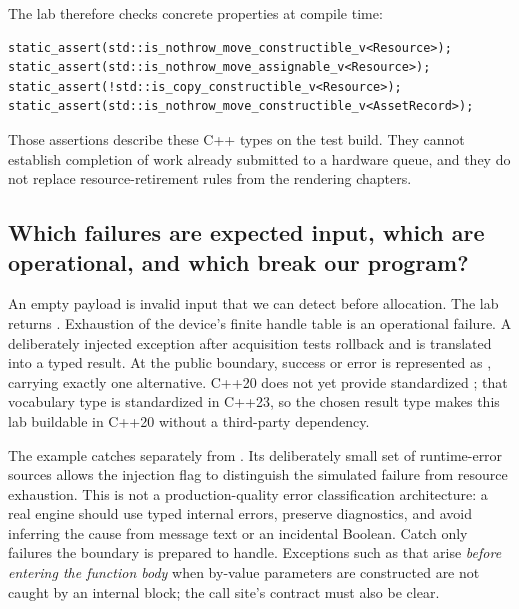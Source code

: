 The lab therefore checks concrete properties at compile time:

\begin{verbatim}
static_assert(std::is_nothrow_move_constructible_v<Resource>);
static_assert(std::is_nothrow_move_assignable_v<Resource>);
static_assert(!std::is_copy_constructible_v<Resource>);
static_assert(std::is_nothrow_move_constructible_v<AssetRecord>);
\end{verbatim}

Those assertions describe these C++ types on the test build. They cannot establish completion of work already submitted to a hardware queue, and they do not replace resource-retirement rules from the rendering chapters.

\subsection{Which failures are expected input, which are operational, and which break our program?}\label{05-engine-i-ch004-which-failures-are-expected-input-which-are-operational-and-which-break-our-program}

\hypertarget{05-engine-i-ch004-which-failures-are-expected-input-which-are-operational-and-which-break-our-program}{}

An empty payload is invalid input that we can detect before allocation. The lab returns . Exhaustion of the device's finite handle table is an operational failure. A deliberately injected exception after acquisition tests rollback and is translated into a typed result. At the public boundary, success or error is represented as , carrying exactly one alternative. C++20 does not yet provide standardized ; that vocabulary type is standardized in C++23, so the chosen result type makes this lab buildable in C++20 without a third-party dependency.

The example catches  separately from . Its deliberately small set of runtime-error sources allows the injection flag to distinguish the simulated failure from resource exhaustion. This is not a production-quality error classification architecture: a real engine should use typed internal errors, preserve diagnostics, and avoid inferring the cause from message text or an incidental Boolean. Catch only failures the boundary is prepared to handle. Exceptions such as  that arise \emph{before entering the function body} when by-value parameters are constructed are not caught by an internal  block; the call site's contract must also be clear.

